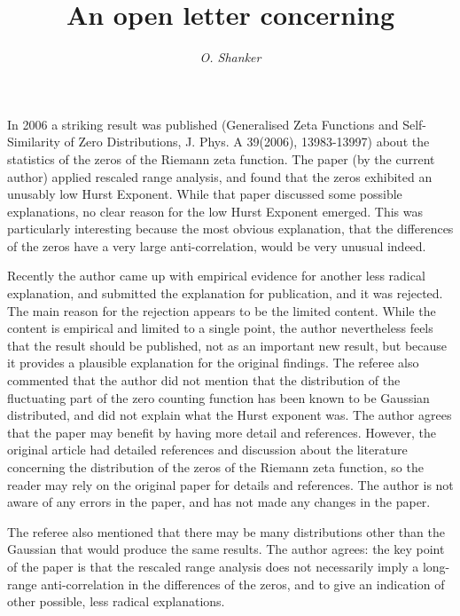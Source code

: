 \documentclass[11pt]{article}
\begin{document}
\title{\bf An open letter concerning \\
\vspace{5mm}{\em   Explanation of low Hurst exponent for Riemann zeta zeros   }}
\author{\large\em O. Shanker }

\date{} %

\maketitle
\thispagestyle{empty}

In 2006 a striking result was published
(Generalised Zeta Functions and Self-Similarity of Zero Distributions, J.
Phys. A 39(2006), 13983-13997) about the
statistics of the zeros of the Riemann zeta function.
The paper (by the current author) applied rescaled range analysis,
and found that the
zeros  exhibited an unusably low Hurst Exponent. While that paper
discussed some possible
explanations, no clear reason for the low Hurst Exponent emerged.
This was particularly
interesting because the most obvious explanation, that the
differences of the zeros have a very large anti-correlation,
 would be very unusual indeed.

Recently the author came up with empirical evidence for another
less radical explanation,
and submitted the explanation for publication, and it was rejected.
The main reason for the rejection appears to be the limited
content.  While the content is empirical
and limited to a single point, the author
nevertheless feels that
the result should be published, not as an important new result, but
because it provides a plausible
explanation for the original findings. The referee also commented that
the author did not mention that the
distribution of the fluctuating part of the zero counting function has
been known to be Gaussian distributed, and did not explain what the
Hurst exponent was.
The author agrees that the paper may
benefit by having more detail and references. However, the original article had
detailed references and discussion  about the literature
concerning the distribution of the zeros of the Riemann zeta function, so
the reader may rely on the original
paper for details and references. The author is not aware of any
errors in the paper, and has not made any changes in the paper.

The referee also mentioned that there may be many distributions
other than the Gaussian that would produce the same results.
The author agrees: the key point of the paper is that the rescaled
range analysis does not necessarily imply a long-range anti-correlation
in the differences of the zeros, and to give an indication of other
possible, less radical explanations.
\end{document}
